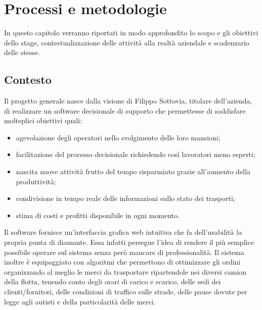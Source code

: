 
\hypertarget{(chap:capitolo2)}{}
\chapter{Processi e metodologie}
In questo capitolo verranno riportati in modo approfondito lo scopo e gli obiettivi dello stage, contestualizzazione delle attività alla realtà aziendale e scadenzario delle stesse.

\section{Contesto}
Il progetto generale nasce dalla visione di Filippo Sottovia, titolare dell'azienda, di realizzare un software decisionale di supporto che permettesse di soddisfare molteplici obiettivi quali:
\begin{itemize}
	\item agevolazione degli operatori nello svolgimento delle loro mansioni;
	\item facilitazione del processo decisionale richiedendo così lavoratori meno esperti;
	\item nascita nuove attività frutto del tempo risparmiato grazie all'aumento della produttività;
	\item condivisione in tempo reale delle informazioni sullo stato dei trasporti;
	\item stima di costi e profitti disponibile in ogni momento.
\end{itemize}

Il software fornisce un'interfaccia grafica web intuitiva che fa dell'usabilità la propria punta di diamante. Essa infatti persegue l'idea di rendere il più semplice possibile operare sul sistema senza però mancare di professionalità. Il sistema inoltre è equipaggiato con algoritmi che permettono di ottimizzare gli ordini organizzando al meglio le merci da trasportare ripartendole nei diversi camion della flotta, tenendo conto degli orari di carico e scarico, delle sedi dei clienti/fornitori, delle condizioni di traffico sulle strade, delle pause dovute per legge agli autisti e della particolarità delle merci.


